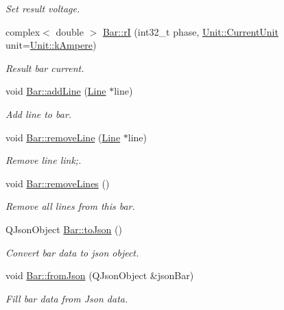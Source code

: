 \begin{DoxyCompactItemize}
\begin{DoxyCompactList}\small\item\em Set result voltage. \end{DoxyCompactList}\item 
complex$<$ double $>$ \hyperlink{group___models_ga8a009531f01430aa68eba739bb0dc2ea}{Bar\+::r\+I} (int32\+\_\+t phase, \hyperlink{class_unit_a0794cf6c9682f48296dd4a5315389787}{Unit\+::\+Current\+Unit} unit=\hyperlink{class_unit_a0794cf6c9682f48296dd4a5315389787a368a3c470f0b590a6100dda717a7dd4f}{Unit\+::k\+Ampere})
\begin{DoxyCompactList}\small\item\em Result bar current. \end{DoxyCompactList}\item 
void \hyperlink{group___models_ga8cbd2f62d92e69ce6c8d561b682464b6}{Bar\+::add\+Line} (\hyperlink{class_line}{Line} $\ast$line)
\begin{DoxyCompactList}\small\item\em Add line to bar. \end{DoxyCompactList}\item 
void \hyperlink{group___models_ga2536c0e5cb97fb627b3520826ece2c99}{Bar\+::remove\+Line} (\hyperlink{class_line}{Line} $\ast$line)
\begin{DoxyCompactList}\small\item\em Remove line link;. \end{DoxyCompactList}\item 
void \hyperlink{group___models_ga4ea1a2074cb45968d80d6add571884a4}{Bar\+::remove\+Lines} ()
\begin{DoxyCompactList}\small\item\em Remove all lines from this bar. \end{DoxyCompactList}\item 
Q\+Json\+Object \hyperlink{group___models_ga3eb84c42b687db6cd98e11b8bd38c86e}{Bar\+::to\+Json} ()
\begin{DoxyCompactList}\small\item\em Convert bar data to json object. \end{DoxyCompactList}\item 
void \hyperlink{group___models_ga1df62f03dd3a066ceaf6588ba6bb6004}{Bar\+::from\+Json} (Q\+Json\+Object \&json\+Bar)
\begin{DoxyCompactList}\small\item\em Fill bar data from Json data. \end{DoxyCompactList}\item 

\end{DoxyCompactItemize}

